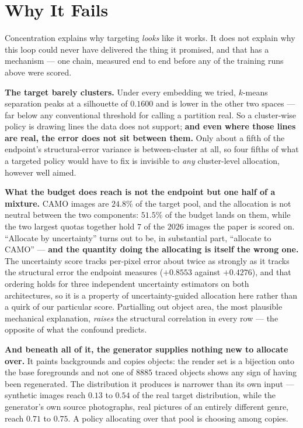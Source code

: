 \documentclass{article} %
\begin{document}
\section{Why It Fails}
\label{sec:why}
Concentration explains why targeting \emph{looks} like it works. It does not explain why this loop
could never have delivered the thing it promised, and that has a mechanism --- one chain, measured
end to end before any of the training runs above were scored.

\textbf{The target barely clusters.} Under every embedding we tried, $k$-means separation peaks at a
silhouette of $0.1600$ and is lower in the other two spaces --- far below any conventional threshold
for calling a partition real. So a cluster-wise policy is drawing lines the data does not
support; \textbf{and even where those lines are real, the error does not sit between them.} Only
about a fifth of the endpoint's structural-error variance is between-cluster at all, so four fifths
of what a targeted policy would have to fix is invisible to \emph{any} cluster-level allocation,
however well aimed.

\textbf{What the budget does reach is not the endpoint but one half of a mixture.} CAMO images are
$24.8\%$ of the target pool, and the allocation is not neutral between the two components: $51.5\%$
of the budget lands on them, while the two largest quotas together hold $7$ of the $2026$ images the
paper is scored on. ``Allocate by uncertainty'' turns out to be, in substantial part, ``allocate
to CAMO'' --- \textbf{and the quantity doing the allocating is itself the wrong one.} The
uncertainty score tracks per-pixel error about twice as strongly as it tracks the structural error
the endpoint measures ($+0.8553$ against $+0.4276$), and that ordering holds for three independent
uncertainty estimators on both architectures, so it is a property of uncertainty-guided allocation
here rather than a quirk of our particular score. Partialling out object area, the most plausible
mechanical explanation, \emph{raises} the structural correlation in every row --- the opposite of
what the confound predicts.

\textbf{And beneath all of it, the generator supplies nothing new to allocate over.} It paints
backgrounds and copies objects: the render set is a bijection onto the base foregrounds and not one
of $8885$ traced objects shows any sign of having been regenerated. The distribution it produces is
narrower than its own input --- synthetic images reach $0.13$ to $0.54$ of the real target
distribution, while the generator's own source photographs, real pictures of an entirely different
genre, reach $0.71$ to $0.75$. A policy allocating over that pool is choosing among copies.
\end{document}
